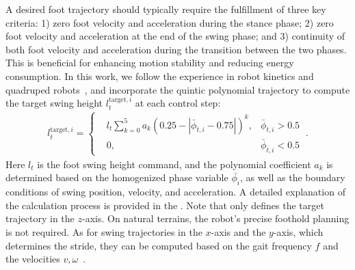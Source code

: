 A desired foot trajectory should typically require the fulfillment of three key criteria: 
1) zero foot velocity and acceleration during the stance phase; 2) zero foot velocity and acceleration at the end of the swing phase; and 3) continuity of both foot velocity and acceleration during the transition between the two phases. This is beneficial for enhancing motion stability and reducing energy consumption. 
In this work, we follow the experience in robot kinetics and quadruped robots~\citep{2016RasHermiteSplines, LocManMPC2021RAL}, and incorporate the quintic polynomial trajectory to compute the target swing height $l_t^{\text{target}, i}$ at each control step: %
\begin{equation}
\begin{aligned}
l_t^{\text{target},i} = \left\{\begin{aligned} 
&l_t \sum_{k=0}^{5} a_k \left(0.25 - \left| \bar{\phi}_{t,i} -0.75 \right| \right)^k   , &\bar{\phi}_{t,i} >0.5\\ 
& 0, & \bar{\phi}_{t, i} < 0.5 \end{aligned}\right.~.
\end{aligned}
\label{eq:ltarget}
\end{equation}
Here $l_t$ is the foot swing height command, and the polynomial coefficient $a_k$ is determined based on the homogenized phase variable $\bar{\phi_i}$, as well as the boundary conditions of swing position, velocity, and acceleration. A detailed explanation of the calculation process is provided in the . Note that  only defines the target trajectory in the $z$-axis. On natural terrains, the robot's precise foothold planning is not required. As for swing trajectories in the $x$-axis and the $y$-axis, which determines the stride, they can be computed based on the gait frequency $f$ and the velocities $v,\omega$~\citep{gehring2013control,linearmpc2018cheetah}. 

